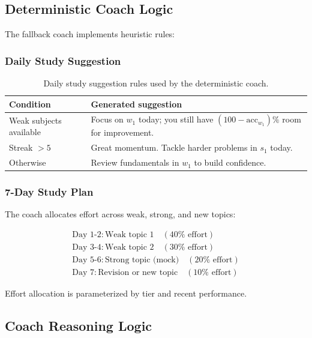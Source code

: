 \documentclass[sigconf,authordraft,twoside]{acmart}
\begin{document}
\subsection{Deterministic Coach Logic}

The fallback coach implements heuristic rules:

\subsubsection{Daily Study Suggestion}
\begin{table}[t]
\centering
\footnotesize
\begin{tabularx}{\columnwidth}{>{\raggedright\arraybackslash}p{} X}
\toprule
\textbf{Condition} & \textbf{Generated suggestion} \\
\midrule
Weak subjects available & Focus on $w_1$ today; you still have $(100 - \text{acc}_{w_1})\%$ room for improvement. \\
Streak $> 5$ & Great momentum. Tackle harder problems in $s_1$ today. \\
Otherwise & Review fundamentals in $w_1$ to build confidence. \\
\bottomrule
\end{tabularx}
\caption{Daily study suggestion rules used by the deterministic coach.}
\end{table}

\subsubsection{7-Day Study Plan}
The coach allocates effort across weak, strong, and new topics:

\begin{equation}
\boxed{\begin{array}{l}
\text{Day 1-2}: \text{Weak topic 1} \quad (40\% \text{ effort}) \\
\text{Day 3-4}: \text{Weak topic 2} \quad (30\% \text{ effort}) \\
\text{Day 5-6}: \text{Strong topic (mock)} \quad (20\% \text{ effort}) \\
\text{Day 7}: \text{Revision or new topic} \quad (10\% \text{ effort})
\end{array}}
\end{equation}

Effort allocation is parameterized by tier and recent performance.

\subsection{Coach Reasoning Logic}
\end{document}
